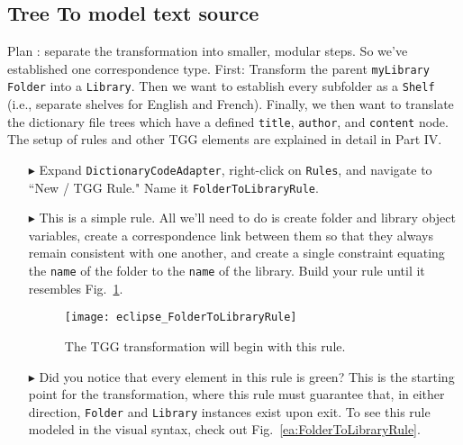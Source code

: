 \newpage
\hypertarget{treeToModel tex}{}
\subsection{Tree To model text source}
\texHeader

Plan : separate the transformation into smaller, modular steps. So we've established one correspondence type. First: Transform the
parent \texttt{myLibrary} \texttt{Folder} into a \texttt{Library}. Then we want to establish every subfolder as a \texttt{Shelf} (i.e., separate shelves
for English and French). Finally, we then want to translate the dictionary file trees which have a defined \texttt{title}, \texttt{author}, and \texttt{content}
node. The setup of rules and other TGG elements are explained in detail in Part IV.

\begin{itemize}
\subsubsection{FolderToLibraryRule} %

\item[$\blacktriangleright$] Expand \texttt{DictionaryCodeAdapter}, right-click on \texttt{Rules}, and navigate to ``New / TGG Rule." Name it
\texttt{Folder\-To\-Lib\-rary\-Rule}.

\item[$\blacktriangleright$] This is a simple rule. All we'll need to do is create folder and library object variables, create a correspondence link between
them so that they always remain consistent with one another, and create a single constraint equating the \texttt{name} of the folder to the \texttt{name} of the
library. Build your rule until it resembles Fig.~\ref{eclipse:FolderToLibraryRule}.

\begin{figure}[htbp]
\begin{center}
  \texttt{[image: eclipse\_FolderToLibraryRule]}
  \caption{The TGG transformation will begin with this rule.}
  \label{eclipse:FolderToLibraryRule}
\end{center}
\end{figure}

\item[$\blacktriangleright$] Did you notice that every element in this rule is green? This is the starting point for the transformation, where this rule must
guarantee that, in either direction, \texttt{Folder} and \texttt{Library} instances exist upon exit. To see this rule modeled in the visual syntax, check out
Fig.~\ref{ea:FolderToLibraryRule}.


\end{itemize}
